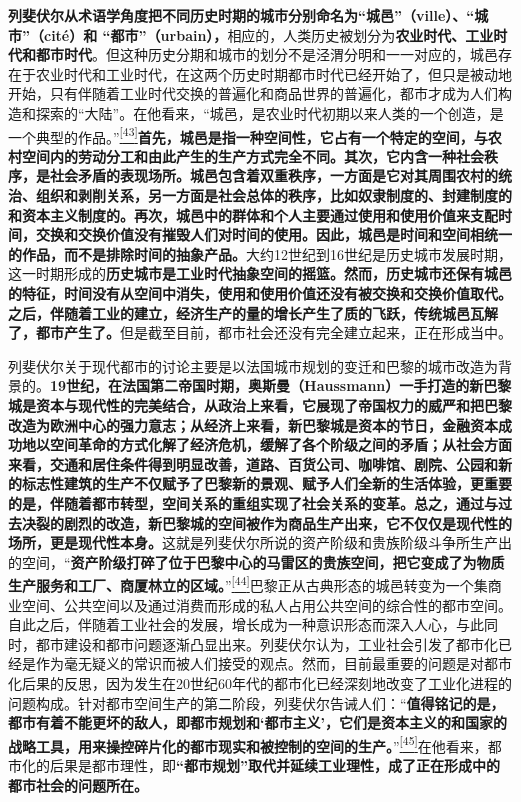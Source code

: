 \documentclass[UTF8, fontset = sourcesans, a4paper, oneside, zihao =
-4, scheme=chinese, no-math, space=true]{ctexbook}
\begin{document}
\textbf{列斐伏尔从术语学角度把不同历史时期的城市分别命名为``城邑''（ville）、``城市''（cité）和
``都市''（urbain），}相应的，人类历史被划分为\textbf{农业时代、工业时代和都市时代}。但这种历史分期和城市的划分不是泾渭分明和一一对应的，城邑存在于农业时代和工业时代，在这两个历史时期都市时代已经开始了，但只是被动地开始，只有伴随着工业时代交换的普遍化和商品世界的普遍化，都市才成为人们构造和探索的``大陆''。在他看来，``城邑，是农业时代初期以来人类的一个创造，是一个典型的作品。''\protect\hypertarget{part0007_split_003.htmlux5cux23w43}{}{}\protect\hyperlink{part0007_split_004.htmlux5cux23m43}{\textsuperscript{{[}43{]}}}\textbf{首先，城邑是指一种空间性，它占有一个特定的空间，与农村空间内的劳动分工和由此产生的生产方式完全不同。其次，它内含一种社会秩序，是社会矛盾的表现场所。城邑包含着双重秩序，一方面是它对其周围农村的统治、组织和剥削关系，另一方面是社会总体的秩序，比如奴隶制度的、封建制度的和资本主义制度的。再次，城邑中的群体和个人主要通过使用和使用价值来支配时间，交换和交换价值没有摧毁人们对时间的使用。因此，城邑是时间和空间相统一的作品，而不是排除时间的抽象产品。}大约12世纪到16世纪是历史城市发展时期，这一时期形成的\textbf{历史城市是工业时代抽象空间的摇篮。然而，历史城市还保有城邑的特征，时间没有从空间中消失，使用和使用价值还没有被交换和交换价值取代。之后，伴随着工业的建立，经济生产的量的增长产生了质的飞跃，传统城邑瓦解了，都市产生了。}但是截至目前，都市社会还没有完全建立起来，正在形成当中。

列斐伏尔关于现代都市的讨论主要是以法国城市规划的变迁和巴黎的城市改造为背景的。\textbf{19世纪，在法国第二帝国时期，奥斯曼（Haussmann）一手打造的新巴黎城是资本与现代性的完美结合，从政治上来看，它展现了帝国权力的威严和把巴黎改造为欧洲中心的强力意志；从经济上来看，新巴黎城是资本的节日，金融资本成功地以空间革命的方式化解了经济危机，缓解了各个阶级之间的矛盾；从社会方面来看，交通和居住条件得到明显改善，道路、百货公司、咖啡馆、剧院、公园和新的标志性建筑的生产不仅赋予了巴黎新的景观、赋予人们全新的生活体验，更重要的是，伴随着都市转型，空间关系的重组实现了社会关系的变革。总之，通过与过去决裂的剧烈的改造，新巴黎城的空间被作为商品生产出来，它不仅仅是现代性的场所，更是现代性本身。}这就是列斐伏尔所说的资产阶级和贵族阶级斗争所生产出的空间，``\textbf{资产阶级打碎了位于巴黎中心的马雷区的贵族空间，把它变成了为物质生产服务和工厂、商厦林立的区域。}''\protect\hypertarget{part0007_split_003.htmlux5cux23w44}{}{}\protect\hyperlink{part0007_split_004.htmlux5cux23m44}{\textsuperscript{{[}44{]}}}巴黎正从古典形态的城邑转变为一个集商业空间、公共空间以及通过消费而形成的私人占用公共空间的综合性的都市空间。自此之后，伴随着工业社会的发展，增长成为一种意识形态而深入人心，与此同时，都市建设和都市问题逐渐凸显出来。列斐伏尔认为，工业社会引发了都市化已经是作为毫无疑义的常识而被人们接受的观点。然而，目前最重要的问题是对都市化后果的反思，因为发生在20世纪60年代的都市化已经深刻地改变了工业化进程的问题构成。针对都市空间生产的第二阶段，列斐伏尔告诫人们：``\textbf{值得铭记的是，都市有着不能更坏的敌人，即都市规划和`都市主义'，它们是资本主义的和国家的战略工具，用来操控碎片化的都市现实和被控制的空间的生产。}''\protect\hypertarget{part0007_split_003.htmlux5cux23w45}{}{}\protect\hyperlink{part0007_split_004.htmlux5cux23m45}{\textsuperscript{{[}45{]}}}在他看来，都市化的后果是都市理性，即\textbf{``都市规划''取代并延续工业理性，成了正在形成中的都市社会的问题所在。}
\end{document}
